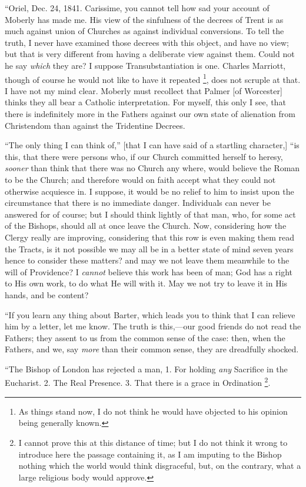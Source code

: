 ``Oriel, Dec. 24, 1841. Carissime, you cannot tell how sad your
account of Moberly has made me. His view of the sinfulness of the
decrees of Trent is as much against union of Churches as against
individual conversions. To tell the truth, I never have examined those
decrees with this object, and have no view; but that is very different
from having a deliberate view against them. Could not he say \emph{which} they
are? I suppose Transubstantiation is one. Charles Marriott, though of
course he would not like to have it repeated \footnote{As things stand now, I
do not think he would have objected to his opinion being generally
known.}, does
not scruple at that. I have not my mind clear. Moberly must recollect
that Palmer [of Worcester] thinks they all bear
a Catholic interpretation. For myself, this only I see, that there is
indefinitely more in the Fathers against our own state of alienation
from Christendom than against the Tridentine Decrees.

``The only thing I can think of,'' [that I can have said of a
startling character,] ``is this, that there were persons
who, if our Church committed herself to heresy, \emph{sooner} than think
that there was no Church any where, would believe the Roman to be the
Church; and therefore would on faith accept what they could not
otherwise acquiesce in. I suppose, it would be no relief to him to
insist upon the circumstance that there is no immediate danger.
Individuals can never be answered for of course; but I should think
lightly of that man, who, for some act of the Bishops, should all at
once leave the Church. Now, considering how the Clergy really are
improving, considering that this row is even making them read the
Tracts, is it not possible we may all be in a better state of mind seven
years hence to consider these matters? and may we not leave them
meanwhile to the will of Providence? I \emph{cannot} believe this work has been
of man; God has a right to His own work, to do what He will with it. May
we not try to leave it in His hands, and be content?

``If you learn any thing about Barter, which leads you to think
that I can relieve him by a letter, let me know. The truth is this,—our
good friends do not read the Fathers; they assent to us from the common
sense of the case: then, when the Fathers, and we, say \emph{more} than
their common sense, they are dreadfully shocked.

``The Bishop of London has rejected a man, 1. For holding \emph{any}
Sacrifice in the Eucharist. 2. The Real Presence. 3. That there is a
grace in Ordination \footnote{I cannot prove this at this distance of time;
but I do not think it wrong to introduce here the passage containing it,
as I am imputing to the Bishop nothing which the world would think
disgraceful, but, on the contrary, what a large religious body would
approve.}.

